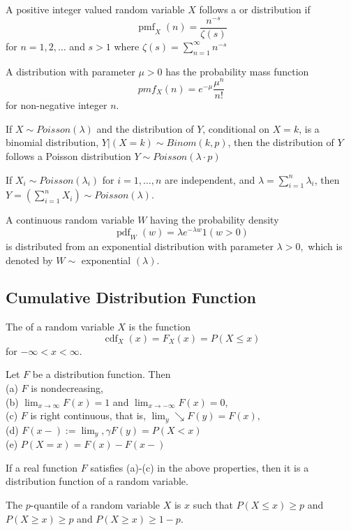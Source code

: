 \documentclass[11pt]{article}
\begin{document}
A positive integer valued random variable \(X\) follows a  or  distribution if
$$
\operatorname{pmf}_{X}(n)=\frac{n^{-s}}{\zeta(s)}
$$
for \(n=1,2, \ldots\) and \(s>1\) where \(\zeta(s)=\sum_{n=1}^{\infty} n^{-s}\)

A  distribution with parameter $\mu > 0$ has the probability mass function
$$ pmf_X(n) = e^{-\mu}\frac{\mu^n}{n!}$$
for non-negative integer $n$.

\theorem
If $X \sim Poisson(\lambda)$ and the distribution of $Y$, conditional on $X = k$, is a binomial distribution, $Y | (X=k) \sim Binom(k,p)$, then the distribution of $Y$ follows a Poisson distribution $Y \sim Poisson(\lambda \cdot p)$

If $X_i \sim Poisson(\lambda_i)$ for $i = 1,\hdots,n$ are independent, and $\lambda = \sum_{i=1}^n \lambda_i$, then $Y = \left( \sum_{i=1}^n X_i\right) \sim Poisson(\lambda)$.


A continuous random variable \(W\) having the probability density
$$
\operatorname{pdf}_{W}(w)=\lambda e^{-\lambda w} 1(w>0)
$$
is distributed from an exponential distribution with parameter \(\lambda>0,\) which is denoted by
\(W \sim\) exponential \((\lambda)\).

\subsection{Cumulative Distribution Function}
The  of a random variable \(X\) is the function
$$
\operatorname{cdf}_{X}(x)=F_{X}(x)=P(X \leq x)
$$
for \(-\infty<x<\infty\).

Let \(F\) be a distribution function. Then\\
(a) \(F\) is nondecreasing,\\
(b) \(\lim _{x \rightarrow \infty} F(x)=1\) and \(\lim _{x \rightarrow-\infty} F(x)=0\),\\
(c) \(F\) is right continuous, that is, \(\lim _{y} \searrow F(y)=F(x),\)\\
(d) \(F(x-):=\lim _{y}, \gamma F(y)=P(X<x)\)\\
(e) \(P(X=x)=F(x)-F(x-)\)

\theorem
If a real function $F$ satisfies (a)-(c) in the above properties, then it is a distribution function of a random variable.

The $p$-quantile of a random variable $X$ is $x$ such that $P(X \leq x) \geq p$ and 
$P(X \geq x) \geq p$ and $P(X \geq x) \geq 1-p$.
\end{document}
